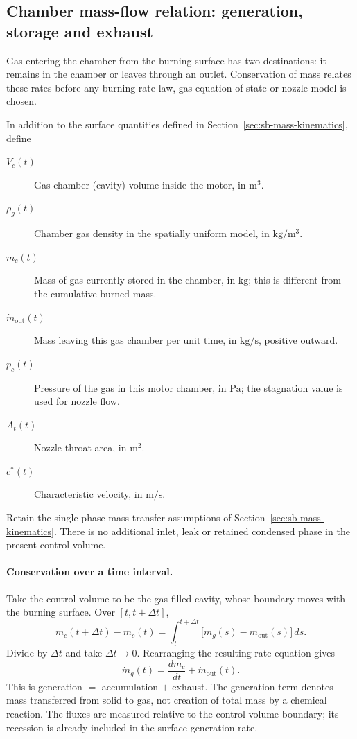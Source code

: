 \subsection{Chamber mass-flow relation: generation, storage and exhaust}
\label{sec:sb-mass-balance}
Gas entering the chamber from the burning surface has two destinations:
it remains in the chamber or leaves through an outlet. Conservation of
mass relates these rates before any burning-rate law, gas equation of
state or nozzle model is chosen.

In addition to the surface quantities defined in
Section~\ref{sec:sb-mass-kinematics}, define
\begin{description}
\item[$V_c(t)$] Gas chamber (cavity) volume inside the motor, in $\mathrm m^3$.
\item[$\rho_g(t)$] Chamber gas density in the spatially uniform model,
in $\mathrm{kg}/\mathrm m^3$.
\item[$m_c(t)$] Mass of gas currently stored in the chamber, in
$\mathrm{kg}$; this is different from the cumulative burned mass.
\item[$\dot m_{\mathrm{out}}(t)$] Mass leaving this gas chamber per unit time,
in $\mathrm{kg}/\mathrm s$, positive outward.
\item[$p_c(t)$] Pressure of the gas in this motor chamber, in $\mathrm{Pa}$; the stagnation value is used for nozzle flow.
\item[$A_t(t)$] Nozzle throat area, in $\mathrm m^2$.
\item[$c^*(t)$] Characteristic velocity, in $\mathrm m/\mathrm s$.
\end{description}
Retain the single-phase mass-transfer assumptions of
Section~\ref{sec:sb-mass-kinematics}. There is no additional inlet,
leak or retained condensed phase in the present control volume.

\paragraph{Conservation over a time interval.}
Take the control volume to be the gas-filled cavity, whose boundary
moves with the burning surface. Over $[t,t+\Delta t]$,
\[
 m_c(t+\Delta t)-m_c(t)
 =\int_t^{t+\Delta t}
   \bigl[\dot m_g(s)-\dot m_{\mathrm{out}}(s)\bigr]\,ds.
\]
Divide by $\Delta t$ and take $\Delta t\to0$. Rearranging the resulting
rate equation gives
\begin{equation}\label{eq:sb-chamber-continuity}
 \boxed{\dot m_g(t)
 =\frac{dm_c}{dt}+\dot m_{\mathrm{out}}(t).}
\end{equation}
This is generation $=$ accumulation $+$ exhaust. The generation term
denotes mass transferred from solid to gas, not creation of total mass
by a chemical reaction. The fluxes are measured relative to the
control-volume boundary; its recession is already included in the
surface-generation rate.

